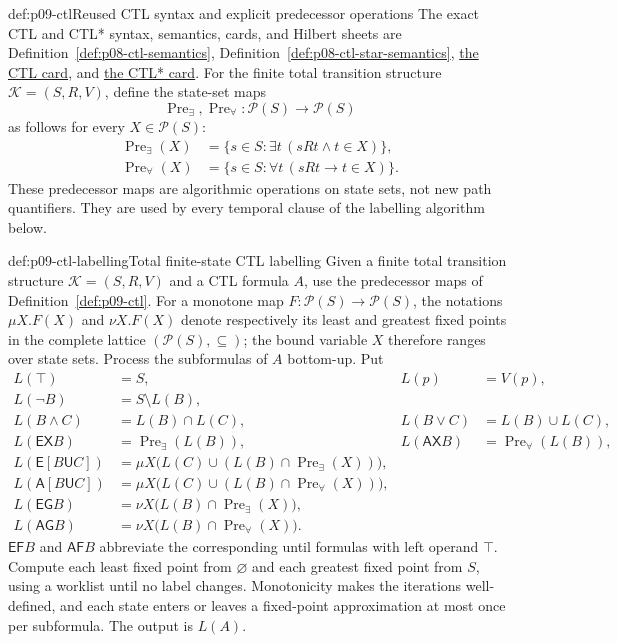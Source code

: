 \begin{hbdefinition}{def:p09-ctl}{Reused CTL syntax and explicit predecessor operations}
The exact CTL and CTL* syntax, semantics, cards, and Hilbert sheets are
Definition~\ref{def:p08-ctl-semantics},
Definition~\ref{def:p08-ctl-star-semantics},
\hyperref[entry:p08-ctl]{the CTL card}, and
\hyperref[entry:p08-ctl-star]{the CTL* card}.  For the finite total transition
structure \(\mathcal K=(S,R,V)\), define the state-set maps
\[
 \operatorname{Pre}_{\exists},\operatorname{Pre}_{\forall}:
 \mathcal P(S)\longrightarrow\mathcal P(S)
\]
as follows for every \(X\in\mathcal P(S)\):
\[
\begin{aligned}
 \operatorname{Pre}_{\exists}(X)
   &=\{s\in S:\exists t\,(sRt\land t\in X)\},\\
 \operatorname{Pre}_{\forall}(X)
   &=\{s\in S:\forall t\,(sRt\to t\in X)\}.
\end{aligned}
\]
These predecessor maps are algorithmic operations on state sets, not new path
quantifiers.  They are used by every temporal clause of the labelling
algorithm below.
\end{hbdefinition}

\begin{hbmethod}{def:p09-ctl-labelling}{Total finite-state CTL labelling}
Given a finite total transition structure \(\mathcal K=(S,R,V)\) and a CTL
formula \(A\), use the predecessor maps of Definition~\ref{def:p09-ctl}.
For a monotone map \(F:\mathcal P(S)\to\mathcal P(S)\), the notations
\(\mu X.F(X)\) and \(\nu X.F(X)\) denote respectively its least and greatest
fixed points in the complete lattice \((\mathcal P(S),\subseteq)\); the bound
variable \(X\) therefore ranges over state sets.  Process the subformulas of
\(A\) bottom-up.  Put
\[
\begin{aligned}
 L(\top)&=S,&
 L(p)&=V(p),\\
 L(\neg B)&=S\setminus L(B),\\
 L(B\land C)&=L(B)\cap L(C),&
 L(B\lor C)&=L(B)\cup L(C),\\
 L(\mathsf{EX}B)&=\operatorname{Pre}_{\exists}(L(B)),&
 L(\mathsf{AX}B)&=\operatorname{Pre}_{\forall}(L(B)),\\
 L(\mathsf E[B\mathsf U C])
 &=\mu X\bigl(L(C)\cup(L(B)\cap\operatorname{Pre}_{\exists}(X))\bigr),\\
 L(\mathsf A[B\mathsf U C])
 &=\mu X\bigl(L(C)\cup(L(B)\cap\operatorname{Pre}_{\forall}(X))\bigr),\\
 L(\mathsf{EG}B)
 &=\nu X\bigl(L(B)\cap\operatorname{Pre}_{\exists}(X)\bigr),\\
 L(\mathsf{AG}B)
 &=\nu X\bigl(L(B)\cap\operatorname{Pre}_{\forall}(X)\bigr).
\end{aligned}
\]
\(\mathsf{EF}B\) and \(\mathsf{AF}B\) abbreviate the corresponding until
formulas with left operand \(\top\).  Compute each least fixed point from
\(\varnothing\) and each greatest fixed point from \(S\), using a worklist
until no label changes.  Monotonicity makes the iterations well-defined, and
each state enters or leaves a fixed-point approximation at most once per
subformula.  The output is \(L(A)\).
\end{hbmethod}


